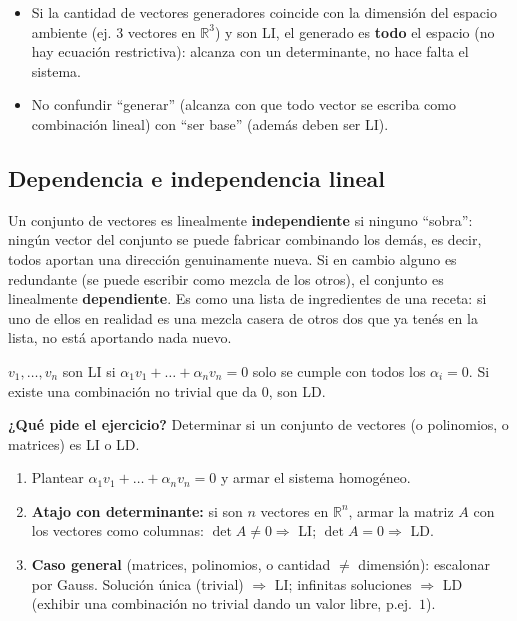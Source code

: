 \documentclass[11pt,a4paper]{article}
\newcommand{\qpide}[1]{\textbf{¿Qué pide el ejercicio?} #1\par}
\begin{document}
\begin{atencion}
\begin{itemize}
    \item Si la cantidad de vectores generadores coincide con la dimensión del espacio
    ambiente (ej. 3 vectores en $\mathbb R^3$) y son LI, el generado es \textbf{todo} el
    espacio (no hay ecuación restrictiva): alcanza con un determinante, no hace falta el
    sistema.
    \item No confundir ``generar'' (alcanza con que todo vector se escriba como
    combinación lineal) con ``ser base'' (además deben ser LI).
\end{itemize}
\end{atencion}

\subsection{Dependencia e independencia lineal}

\begin{intuicion}
Un conjunto de vectores es linealmente \textbf{independiente} si ninguno ``sobra'': ningún
vector del conjunto se puede fabricar combinando los demás, es decir, todos aportan una
dirección genuinamente nueva. Si en cambio alguno es redundante (se puede escribir como
mezcla de los otros), el conjunto es linealmente \textbf{dependiente}. Es como una lista
de ingredientes de una receta: si uno de ellos en realidad es una mezcla casera de otros
dos que ya tenés en la lista, no está aportando nada nuevo.
\end{intuicion}

\begin{teoria}[Definición]
$v_1,\dots,v_n$ son LI si $\alpha_1v_1+\dots+\alpha_nv_n=0$ solo se cumple con todos los
$\alpha_i=0$. Si existe una combinación no trivial que da $0$, son LD.
\end{teoria}

\qpide{Determinar si un conjunto de vectores (o polinomios, o matrices) es LI o LD.}

\begin{proc}
\begin{enumerate}
    \item Plantear $\alpha_1v_1+\dots+\alpha_nv_n=0$ y armar el sistema homogéneo.
    \item \textbf{Atajo con determinante:} si son $n$ vectores en $\mathbb R^n$, armar la
    matriz $A$ con los vectores como columnas: $\det A\neq0\Rightarrow$ LI;
    $\det A=0\Rightarrow$ LD.
    \item \textbf{Caso general} (matrices, polinomios, o cantidad $\neq$ dimensión):
    escalonar por Gauss. Solución única (trivial) $\Rightarrow$ LI; infinitas soluciones
    $\Rightarrow$ LD (exhibir una combinación no trivial dando un valor libre, p.ej.\ $1$).
\end{enumerate}
\end{proc}
\end{document}
